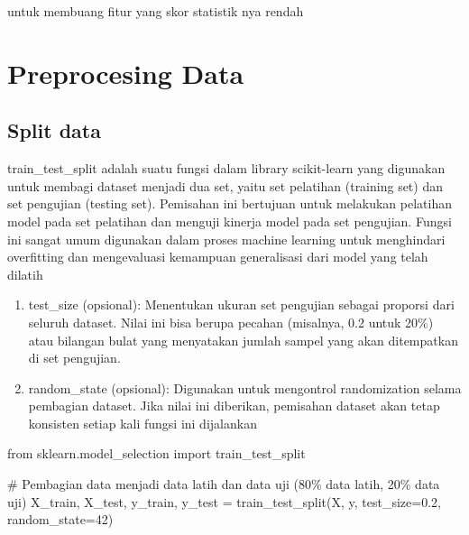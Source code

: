 \documentclass[
  letterpaper,
]{krantz}
\makeatletter
\newenvironment{Shaded}{\begin{snugshade}}{\end{snugshade}}
\newcommand{\CommentTok}[1]{\textcolor[rgb]{0.37,0.37,0.37}{#1}}
\newcommand{\DecValTok}[1]{\textcolor[rgb]{0.68,0.00,0.00}{#1}}
\newcommand{\FloatTok}[1]{\textcolor[rgb]{0.68,0.00,0.00}{#1}}
\newcommand{\ImportTok}[1]{\textcolor[rgb]{0.00,0.46,0.62}{#1}}
\newcommand{\NormalTok}[1]{\textcolor[rgb]{0.00,0.23,0.31}{#1}}
\newcommand{\OperatorTok}[1]{\textcolor[rgb]{0.37,0.37,0.37}{#1}}
\newenvironment{kframe}{%
\medskip{}
\setlength{\fboxsep}{.8em}
 \def\at@end@of@kframe{}%
 \ifinner\ifhmode%
  \def\at@end@of@kframe{\end{minipage}}%
  \begin{minipage}{\columnwidth}%
 \fi\fi%
 \def\FrameCommand##1{\hskip\@totalleftmargin \hskip-\fboxsep
 \colorbox{shadecolor}{##1}\hskip-\fboxsep
     \hskip-\linewidth \hskip-\@totalleftmargin \hskip\columnwidth}%
 \MakeFramed {\advance\hsize-\width
   \@totalleftmargin\z@ \linewidth\hsize
   \@setminipage}}%
 {\par\unskip\endMakeFramed%
 \at@end@of@kframe}
\renewenvironment{Shaded}{\begin{kframe}}{\end{kframe}}
\makeatother
\begin{document}
untuk membuang fitur yang skor statistik nya rendah

\hypertarget{preprocesing-data}{%
\section{Preprocesing Data}\label{preprocesing-data}}

\hypertarget{split-data}{%
\subsection{Split data}\label{split-data}}

train\_test\_split adalah suatu fungsi dalam library scikit-learn yang
digunakan untuk membagi dataset menjadi dua set, yaitu set pelatihan
(training set) dan set pengujian (testing set). Pemisahan ini bertujuan
untuk melakukan pelatihan model pada set pelatihan dan menguji kinerja
model pada set pengujian. Fungsi ini sangat umum digunakan dalam proses
machine learning untuk menghindari overfitting dan mengevaluasi
kemampuan generalisasi dari model yang telah dilatih

\begin{enumerate}
\def\labelenumi{\arabic{enumi}.}
\item
  test\_size (opsional): Menentukan ukuran set pengujian sebagai
  proporsi dari seluruh dataset. Nilai ini bisa berupa pecahan
  (misalnya, 0.2 untuk 20\%) atau bilangan bulat yang menyatakan jumlah
  sampel yang akan ditempatkan di set pengujian.
\item
  random\_state (opsional): Digunakan untuk mengontrol randomization
  selama pembagian dataset. Jika nilai ini diberikan, pemisahan dataset
  akan tetap konsisten setiap kali fungsi ini dijalankan
\end{enumerate}

\begin{Shaded}
\begin{Highlighting}[]
\ImportTok{from}\NormalTok{ sklearn.model\_selection }\ImportTok{import}\NormalTok{ train\_test\_split}


\CommentTok{\# Pembagian data menjadi data latih dan data uji (80\% data latih, 20\% data uji)}
\NormalTok{X\_train, X\_test, y\_train, y\_test }\OperatorTok{=}\NormalTok{ train\_test\_split(X, y, test\_size}\OperatorTok{=}\FloatTok{0.2}\NormalTok{, random\_state}\OperatorTok{=}\DecValTok{42}\NormalTok{)}
\end{Highlighting}
\end{Shaded}
\end{document}
